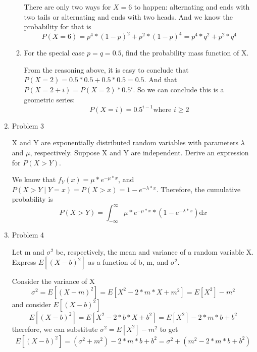 \documentclass[letterpaper]{article}
\begin{document}
\begin{enumerate}
\begin{enumerate}
There are only two ways for $X=6$ to happen: alternating and ends with two tails or alternating and ends with two heads. And we know the probability for that is
\begin{equation}
P(X = 6) = p^4*(1-p)^2 + p^2*(1-p)^4 = p^4 * q^2 + p^2 * q^4
\end{equation}

\item{}  For the special case $p = q = 0.5$, find the probability mass function of X.

From the reasoning above, it is easy to conclude that $P(X = 2) = 0.5 * 0.5 + 0.5 * 0.5 = 0.5$. And that $P(X = 2 + i) = P(X = 2) * 0.5 ^ i$. So we can conclude this is a geometric series:
\begin{equation}
P(X = i) = 0.5^{i-1} \text{where $i \ge 2$}
\end{equation}


\end{enumerate}
\medskip

\item{Problem 3}
\begin{mdframed}
X and Y are exponentially distributed random variables with parameters $\lambda$ and $\mu$, respectively. Suppose X and Y are independent. Derive an expression for $P(X > Y)$.
\end{mdframed}

We know that $f_Y(x) = \mu * e^{-\mu*x}$, and $P(X > Y \mid Y = x) = P(X > x) = 1 - e^{-\lambda * x}$. Therefore, the cumulative probability is
\begin{equation}
P(X > Y) = \int_{-\infty}^{\infty}{\mu * e^{-\mu*x} * (1 - e^{-\lambda * x})} \mathrm{d}x
\end{equation}
\medskip

\item{Problem 4}
\begin{mdframed}
Let m and $\sigma^2$ be, respectively, the mean and variance of a random variable X. Express $E[(X - b)^2]$ as a function of b, m, and $\sigma^2$.
\end{mdframed}

Consider the variance of X
\begin{equation}
\sigma^2 = E[(X-m)^2] = E[X^2 - 2*m*X + m^2] = E[X^2] - m^2
\end{equation}
and consider $E[(X - b)^2]$
\begin{equation}
E[(X - b)^2] = E[X^2 - 2*b*X + b^2] = E[X^2] - 2*m*b + b^2
\end{equation}
therefore, we can substitute $\sigma^2 = E[X^2] - m^2$ to get
\begin{equation}
E[(X - b)^2] = (\sigma^2 + m^2) - 2*m*b + b^2 = \sigma^2 + (m^2 - 2*m*b + b^2)
\end{equation}


\end{enumerate}
\end{document}
